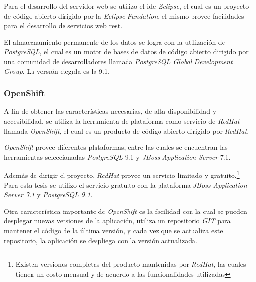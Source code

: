 Para el desarrollo del servidor web se utilizo el \Gls{ide} \textit{Eclipse}, el
cual es un proyecto de código abierto dirigido por la \textit{Eclipse
    Fundation}\cite{eclipse}, el mismo provee facilidades para el desarrollo de
servicios web \Gls{rest}.

El almacenamiento permanente de los datos se logra con la utilización de
\textit{PostgreSQL}, el cual es un motor de bases de datos de código abierto
dirigido por una comunidad de desarrolladores llamada \textit{PostgreSQL Global
    Development Group}. La versión elegida es la 9.1.

\subsubsection{OpenShift}

A fin de obtener las características necesarias, de alta disponibilidad y
accesibilidad, se utiliza la herramienta de plataforma como servicio de
\textit{RedHat} llamada \textit{OpenShift}, el cual es un producto de código
abierto dirigido por \textit{RedHat}.

\textit{OpenShift} provee diferentes plataformas, entre las cuales se encuentran
las herramientas seleccionadas \textit{PostgreSQL} 9.1 y \textit{JBoss
    Application Server} 7.1.

Además de dirigir el proyecto, \textit{RedHat} provee un servicio limitado y
gratuito\cite{openshift:pricing}.\footnote{Existen versiones completas del
    producto mantenidas por \textit{RedHat}, las cuales tienen un costo mensual
    y de acuerdo a las funcionalidades utilizadas\cite{openshift:pricing}} Para
esta tesis se utilizo el servicio gratuito con la plataforma \textit{JBoss
    Application Server 7.1} y \textit{PostgreSQL 9.1}.

Otra característica importante de \textit{OpenShift} es la facilidad con la cual
se pueden desplegar nuevas versiones de la aplicación, utiliza un repositorio
\textit{GIT} para mantener el código de la última versión, y cada vez que se
actualiza este repositorio, la aplicación se despliega con la versión
actualizada.

